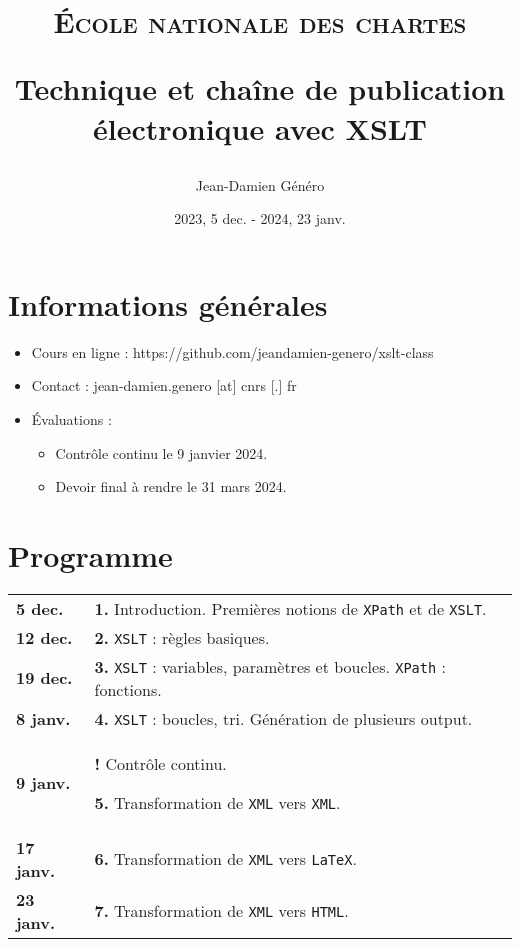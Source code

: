 \documentclass[a4paper]{article}
\title{\textsc{École nationale des chartes}

\bigskip

Technique et chaîne de publication électronique avec XSLT}
\author{Jean-Damien Généro}
\date{2023, 5 dec. - 2024, 23 janv.}
\begin{document}
\maketitle

\section*{Informations générales}

\begin{itemize}
    \item Cours en ligne : https://github.com/jeandamien-genero/xslt-class
    \item Contact : jean-damien.genero [at] cnrs [.] fr
    \item Évaluations :
    \begin{itemize}
        \item Contrôle continu le 9 janvier 2024.
        \item Devoir final à rendre le 31 mars 2024.
    \end{itemize}
\end{itemize}

\bigskip

\section*{Programme}

\renewcommand{\arraystretch}{1.5}
\begin{center}
    \begin{tabular}[h]{|p{1.5cm} p{9.6cm}}
        \textbf{5 dec.} & \textbf{1.} Introduction. Premières notions de \texttt{XPath} et de \texttt{XSLT}.\\
        \textbf{12 dec.} & \textbf{2.} \texttt{XSLT} : règles basiques.  \\
        \textbf{19 dec.} & \textbf{3.} \texttt{XSLT} : variables, paramètres et boucles. \texttt{XPath} : fonctions. \\
        \textbf{8 janv.} & \textbf{4.} \texttt{XSLT} :  boucles, tri. Génération de plusieurs output. \\
        \textbf{9 janv.} & \textbf{!}  Contrôle continu.
        
        \textbf{5.} Transformation de \texttt{XML}  vers \texttt{XML}. \\
        \textbf{17 janv.} & \textbf{6.} Transformation de \texttt{XML}  vers \texttt{LaTeX}. \\
        \textbf{23 janv.} & \textbf{7.} Transformation de \texttt{XML}  vers \texttt{HTML}. \\
    \end{tabular}
\end{center}
\end{document}
